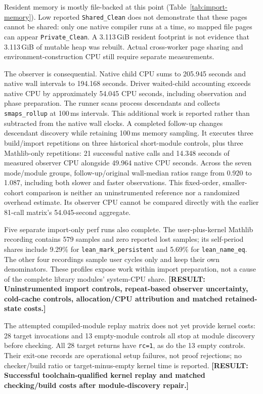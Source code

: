 \documentclass[10pt,twocolumn]{article}
\newcommand{\missing}[1]{\textbf{[RESULT: #1]}}
\begin{document}
Resident memory is mostly file-backed at this point
(Table~\ref{tab:import-memory}). Low reported \texttt{Shared\_Clean}
does not demonstrate that these pages cannot be shared: only one native
compiler runs at a time, so mapped file pages can appear
\texttt{Private\_Clean}. A 3.113\,GiB resident footprint is not evidence
that 3.113\,GiB of mutable heap was rebuilt.
Actual cross-worker page sharing and environment-construction CPU
still require separate measurements.

The observer is consequential. Native child CPU sums to 205.945 seconds
and native wall intervals to 194.168 seconds.
Driver waited-child accounting exceeds native CPU by approximately
54.045 CPU seconds, including observation and phase preparation.
The runner scans process descendants and collects \texttt{smaps\_rollup}
at 100\,ms intervals. This additional work is reported rather than
subtracted from the native wall clocks.
A completed follow-up changes descendant discovery while retaining
100\,ms memory sampling. It executes three build/import repetitions on
three historical short-module controls, plus three Mathlib-only repetitions:
21 successful native calls and 14.348 seconds of measured observer CPU
alongside 49.964 native CPU seconds.
Across the seven mode/module groups, follow-up/original wall-median ratios
range from 0.920 to 1.087, including both slower and faster observations.
This fixed-order, smaller-cohort comparison is neither an uninstrumented
reference nor a randomized overhead estimate. Its observer CPU cannot be
compared directly with the earlier 81-call matrix's 54.045-second aggregate.

Five separate import-only perf runs also complete.
The user-plus-kernel Mathlib recording contains 579 samples and zero
reported lost samples; its self-period shares include 9.29\% for
\texttt{lean\_mark\_persistent} and 5.69\% for \texttt{lean\_name\_eq}.
The other four recordings sample user cycles only and keep their own
denominators. These profiles expose work within import preparation,
not a cause of the complete library modules' system-CPU share.
\missing{Uninstrumented import controls, repeat-based observer uncertainty,
cold-cache controls, allocation/CPU attribution and matched retained-state costs.}

The attempted compiled-module replay matrix does not yet provide kernel
costs: 28 target invocations and 13 empty-module controls all stop at
module discovery before checking.
All 28 target returns have \texttt{rc=1}, as do the 13 empty controls.
Their exit-one records are operational setup failures, not proof rejections;
no checker/build ratio or target-minus-empty kernel time is reported.
\missing{Successful toolchain-qualified kernel replay and matched
checking/build costs after module-discovery repair.}
\end{document}
